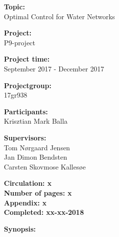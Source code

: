 \begin{minipage}[t]{0.48\textwidth}
\textbf{Topic:} \\[5pt]\bigskip\hspace{2ex}
Optimal Control for Water Networks

\textbf{Project:} \\[5pt]\bigskip\hspace{2ex}
P9-project

\textbf{Project time:} \\[5pt]\bigskip\hspace{2ex}
September 2017 - December 2017

\textbf{Projectgroup:} \\[5pt]\bigskip\hspace{2ex}
17gr938	

\textbf{Participants:} \\[5pt]\hspace*{2ex}
Krisztian Mark Balla \\\hspace*{2ex}

\textbf{Supervisors:} \\[5pt]\hspace*{2ex}
Tom Nørgaard Jensen \\\hspace*{2ex}
Jan Dimon Bendsten \\\hspace*{2ex}
Carsten Skovmose Kallesøe \\\bigskip\hspace{2ex}

\vspace*{3.5cm}

\textbf{Circulation: x} \\
\textbf{Number of pages: x}\\
\textbf{Appendix: x } \\
\textbf{Completed: xx-xx-2018}\\
\end{minipage}
\hfill
\begin{minipage}[t]{0.483\textwidth}
\textbf{Synopsis:} \\[5pt]
\fbox{\parbox{7cm}{\bigskip\bigskip}}
\end{minipage}

\vfill